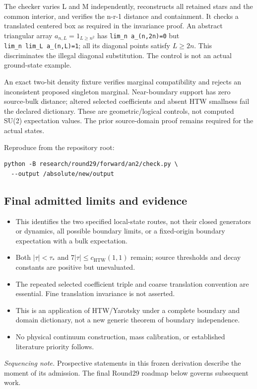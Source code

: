The checker varies L and M independently, reconstructs all retained stars and the common interior, and verifies the n-r-1 distance and containment. It checks a translated centered box as required in the invariance proof. An abstract triangular array \(a_{n,L}=1_{L\ge n^{2}}\) has \texttt{lim\_n\ a\_(n,2n)=0} but \texttt{lim\_n\ lim\_L\ a\_(n,L)=1}; all its diagonal points satisfy \(L\ge 2n\). This discriminates the illegal diagonal substitution. The control is not an actual ground-state example.

An exact two-bit density fixture verifies marginal compatibility and rejects an inconsistent proposed singleton marginal. Near-boundary support has zero source-bulk distance; altered selected coefficients and absent HTW smallness fail the declared dictionary. These are geometric/logical controls, not computed SU(2) expectation values. The prior source-domain proof remains required for the actual states.

Reproduce from the repository root:
\begin{verbatim}
python -B research/round29/forward/an2/check.py \
  --output /absolute/new/output
\end{verbatim}

\subsection*{Final admitted limits and evidence}
\begin{itemize}
\item This identifies the two specified local-state routes, not their closed generators or dynamics, all possible boundary limits, or a fixed-origin boundary expectation with a bulk expectation.
\item Both \(|\tau|<\tau_*\) and \(7|\tau|\le c_{\mathrm{HTW}}(1,1)\) remain; source thresholds and decay constants are positive but unevaluated.
\item The repeated selected coefficient triple and coarse translation convention are essential. Fine translation invariance is not asserted.
\item This is an application of HTW/Yarotsky under a complete boundary and domain dictionary, not a new generic theorem of boundary independence.
\item No physical continuum construction, mass calibration, or established literature priority follows.
\end{itemize}
\par{}\par{}

\emph{Sequencing note.} Prospective statements in this frozen derivation describe the moment of its admission. The final Round29 roadmap below governs subsequent work.
